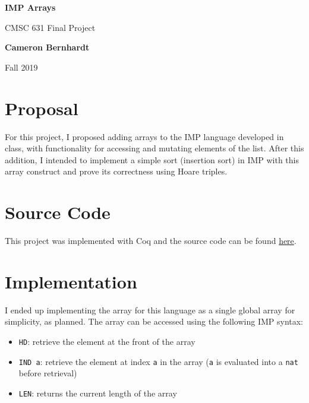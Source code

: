 \documentclass{article}
\begin{document}
    \begin{center}
        \vspace*{1cm}
        
        \Huge
        \textbf{IMP Arrays}
        
        \vspace{0.5cm}
        \LARGE
        CMSC 631 Final Project

        \vspace{1.5cm}

        \textbf{Cameron Bernhardt}

        \vfill

        Fall 2019
    \end{center}
    
    \newpage

    \section{Proposal}
    For this project, I proposed adding arrays to the IMP language developed in class, with functionality for accessing and mutating elements of the list. After this addition, I intended to implement a simple sort (insertion sort) in IMP with this array construct and prove its correctness using Hoare triples.

    \section{Source Code}
    This project was implemented with Coq and the source code can be found \href{https://github.com/AstroCB/IMP-Arrays}{here}.

    \section{Implementation}
    I ended up implementing the array for this language as a single global array for simplicity, as planned. The array can be accessed using the following IMP syntax:
    \begin{itemize}
        \item \texttt{HD}: retrieve the element at the front of the array
        \item \texttt{IND a}: retrieve the element at index \texttt{a} in the array (\texttt{a} is evaluated into a \texttt{nat} before retrieval)
        \item \texttt{LEN}: returns the current length of the array
    \end{itemize}
\end{document}
